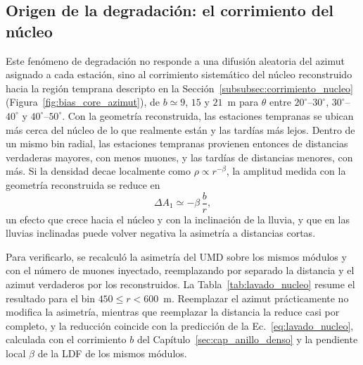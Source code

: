 \subsection{Origen de la degradación: el corrimiento del núcleo}
\label{subsec:lavado_nucleo}

{\leavevmode\color{blue}Este fenómeno de degradación no responde a una difusión aleatoria del azimut asignado a cada estación, sino al corrimiento sistemático del núcleo reconstruido hacia la región temprana descripto en la Sección~\ref{subsubsec:corrimiento_nucleo} (Figura~\ref{fig:bias_core_azimut}), de $b \simeq 9$, $15$ y $21$~m para $\theta$ entre $20^\circ$--$30^\circ$, $30^\circ$--$40^\circ$ y $40^\circ$--$50^\circ$. Con la geometría reconstruida, las estaciones tempranas se ubican más cerca del núcleo de lo que realmente están y las tardías más lejos. Dentro de un mismo bin radial, las estaciones tempranas provienen entonces de distancias verdaderas mayores, con menos muones, y las tardías de distancias menores, con más. Si la densidad decae localmente como $\rho \propto r^{-\beta}$, la amplitud medida con la geometría reconstruida se reduce en
\begin{equation}
	\Delta A_1 \simeq -\beta\,\frac{b}{r},
	\label{eq:lavado_nucleo}
\end{equation}
un efecto que crece hacia el núcleo y con la inclinación de la lluvia, y que en las lluvias inclinadas puede volver negativa la asimetría a distancias cortas.}

{\leavevmode\color{blue}Para verificarlo, se recalculó la asimetría del UMD sobre los mismos módulos y con el número de muones inyectado, reemplazando por separado la distancia y el azimut verdaderos por los reconstruidos. La Tabla~\ref{tab:lavado_nucleo} resume el resultado para el bin $450 \leq r < 600$~m. Reemplazar el azimut prácticamente no modifica la asimetría, mientras que reemplazar la distancia la reduce casi por completo, y la reducción coincide con la predicción de la Ec.~\ref{eq:lavado_nucleo}, calculada con el corrimiento $b$ del Capítulo~\ref{sec:cap_anillo_denso} y la pendiente local $\beta$ de la LDF de los mismos módulos.}

